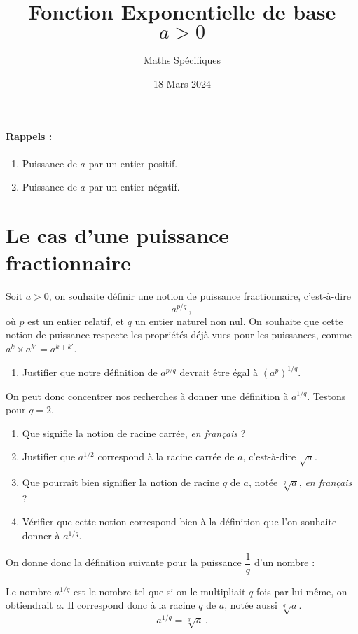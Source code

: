 \documentclass{article}
\author{Maths Spécifiques}
\title{Fonction Exponentielle de base $a>0$}
\date{18 Mars 2024}
\begin{document}
\maketitle

\paragraph{Rappels :}
\begin{enumerate}
\item Puissance de $a$ par un entier positif.
\vspace*{0.5cm}
\item Puissance de $a$ par un entier négatif. 
\vspace*{0.5cm}
\end{enumerate}
\section{Le cas d'une puissance fractionnaire}
Soit $a>0$, on souhaite définir une notion de puissance fractionnaire, c'est-à-dire
\begin{equation*}
a^{p/q}\,,    
\end{equation*}
où $p$ est un entier relatif, et $q$ un entier naturel non nul. On souhaite que cette notion de puissance respecte les propriétés déjà vues pour les puissances, comme $a^k \times a^{k'} = a^{k + k'}$.
\begin{enumerate}
\item Justifier que notre définition de $a^{p/q}$ devrait être égal à $(a^p)^{1/q}$.
\end{enumerate}
On peut donc concentrer nos recherches à donner une définition à $a^{1/q}$. Testons pour $q = 2$.
\begin{enumerate}[resume*]
\item Que signifie la notion de racine carrée, \emph{en français} ?
\item Justifier que $a^{1/2}$ correspond à la racine carrée de $a$, c'est-à-dire $\sqrt{a}$.
\item Que pourrait bien signifier la notion de racine $q$\ieme{} de $a$, notée $\sqrt[q]{a}$, \emph{en français} ?
\item Vérifier que cette notion correspond bien à la définition que l'on souhaite donner à $a^{1/q}$.
\end{enumerate}
\vspace*{7cm}
On donne donc la définition suivante pour la puissance $\dfrac{1}{q}$ d'un nombre : 
\begin{definition}
Le nombre $a^{1/q}$ est le nombre tel que si on le multipliait $q$ fois par lui-même, on obtiendrait $a$. Il correspond donc à la racine $q$\ieme{} de $a$, notée aussi $\sqrt[q]{a}$.
\begin{equation*}
a^{1/q} = \sqrt[q]{a}\,.
\end{equation*}
\end{definition}
\end{document}
